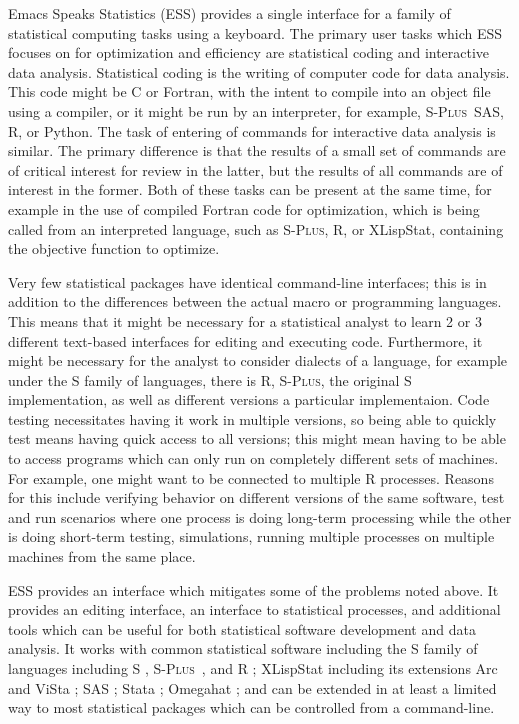 \documentclass{article}
\newcommand*{\Splus}{\textsc{S-Plus}}
\begin{document}
Emacs Speaks Statistics (ESS) provides a single interface for a family
of statistical computing tasks using a keyboard.  The primary user
tasks which ESS focuses on for optimization and efficiency are
statistical coding and interactive data analysis.  Statistical coding
is the writing of computer code for data analysis.  This code might be
C or Fortran, with the intent to compile into an object file using a
compiler, or it might be run by an interpreter, for example, \Splus\,
SAS, R, or Python.  The task of entering of commands for interactive
data analysis is similar.  The primary difference is that the results
of a small set of commands are of critical interest for review in the
latter, but the results of all commands are of interest in the former.
Both of these tasks can be present at the same time, for example in
the use of compiled Fortran code for optimization, which is being
called from an interpreted language, such as \Splus, R, or XLispStat,
containing the objective function to optimize.

Very few statistical packages have identical command-line interfaces;
this is in addition to the differences between the actual macro or
programming languages.  This means that it might be necessary for a
statistical analyst to learn 2 or 3 different text-based interfaces
for editing and executing code.  Furthermore, it might be necessary
for the analyst to consider dialects of a language, for example under
the S family of languages, there is R, \Splus, the original S
implementation, as well as different versions a particular
implementaion.  Code testing necessitates having it work in multiple
versions, so being able to quickly test means having quick access to
all versions; this might mean having to be able to access programs
which can only run on completely different sets of machines.  For
example, one might want to be connected to multiple R processes.
Reasons for this include verifying behavior on different versions of
the same software, test and run scenarios where one process is doing
long-term processing while the other is doing short-term testing,
simulations, running multiple processes on multiple machines from the
same place.

ESS provides an interface which mitigates some of the problems noted
above.  It provides an editing interface, an interface to statistical
processes, and additional tools which can be useful for both
statistical software development and data analysis.  It works with
common statistical software including the S family of languages
including S \citep{BecRCW88,ChaJH92,ChaJ98}, \Splus\ \citep{Splus},
and R \citep{ihak:gent:1996}; XLispStat \citep{Tier90} including its
extensions Arc \citep{Cook:Weisberg:1999} and ViSta
\citep{youn:fald:mcfa:1992}; SAS \citep{SAS:8.0}; Stata
\citep{Stata:6.0}; Omegahat \citep{DTLang:2000}; and can be extended
in at least a limited way to most statistical packages which can be
controlled from a command-line.
\end{document}
